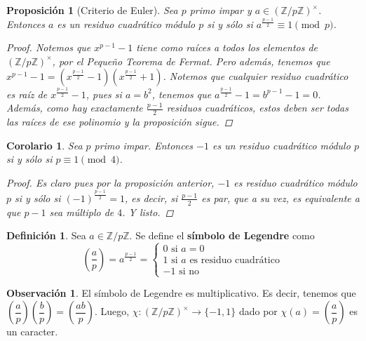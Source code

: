 \documentclass[12pt]{book}
\newtheorem{prop}[teo]{Proposición}
\newtheorem{cor}[teo]{Corolario}
\theoremstyle{definition}
\newtheorem{obs}[teo]{Observación}
\newtheorem{defn}[teo]{Definición}
\newcommand{\ZZ}{\mathbb{Z}}      %
\begin{document}
\begin{prop}[Criterio de Euler]
Sea $p$ primo impar y $a\in(\ZZ/p\ZZ)^\times$. Entonces $a$ es un residuo cuadrático módulo $p$ si y sólo si $a^{\frac{p-1}{2}}\equiv 1 \pmod{p}$.
\begin{proof}
Notemos que $x^{p-1}-1$ tiene como raíces a todos los elementos de $(\ZZ/p\ZZ)^\times$, por el Pequeño Teorema de Fermat. Pero además, tenemos que $x^{p-1}-1 = (x^{\frac{p-1}{2}}-1)(x^{\frac{p-1}{2}}+1)$. Notemos que cualquier residuo cuadrático es raíz de $x^{\frac{p-1}{2}}-1$, pues si $a=b^2$, tenemos que $a^{\frac{p-1}{2}}-1 = b^{p-1}-1 = 0$. Además, como hay exactamente $\frac{p-1}{2}$ residuos cuadráticos, estos deben ser todas las raíces de ese polinomio y la proposición sigue.
\end{proof}
\end{prop}

\begin{cor}
Sea $p$ primo impar. Entonces $-1$ es un residuo cuadrático módulo $p$ si y sólo si $p\equiv 1 \pmod{4}$.
\begin{proof}
Es claro pues por la proposición anterior, $-1$ es residuo cuadrático módulo $p$ si y sólo si $(-1)^{\frac{p-1}{2}}=1$, es decir, si $\frac{p-1}{2}$ es par, que a su vez, es equivalente a que $p-1$ sea múltiplo de $4$. Y listo.
\end{proof}
\end{cor}

\begin{defn}
Sea $a\in\ZZ/p\ZZ$. Se define el \textbf{símbolo de Legendre} como $$\left(\dfrac{a}{p}\right) = a^{\frac{p-1}{2}} = \begin{cases}0 \text{ si } a=0\\ 1 \text{ si }a \text{ es residuo cuadrático} \\ -1 \text{ si no}\end{cases}$$
\end{defn}

\begin{obs}
El símbolo de Legendre es multiplicativo. Es decir, tenemos que $\left(\dfrac{a}{p}\right)\left(\dfrac{b}{p}\right) = \left(\dfrac{ab}{p}\right)$. Luego, $\chi: (\ZZ/p\ZZ)^\times \to \{-1,1\}$ dado por $\chi(a) = \left(\dfrac{a}{p}\right)$ es un caracter.
\end{obs}
\end{document}

